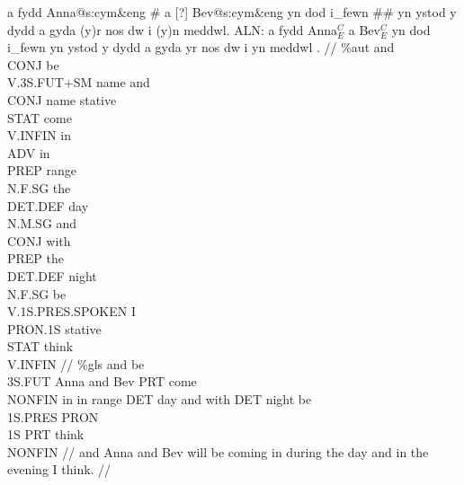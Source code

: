 \documentclass[12pt]{article}
\begin{document}
\def\suffdot#1{{\scriptsize .#1}}

\ex
\begingl
a fydd Anna@s:cym\&eng \# a [?] Bev@s:cym\&eng yn dod i\_fewn \#\# yn ystod y dydd a gyda (y)r nos dw i (y)n meddwl.
\gla ALN:  a fydd Anna$^{C}_{E}$ a Bev$^{C}_{E}$ yn dod i\_fewn yn ystod y dydd a gyda yr nos dw i yn meddwl .  //
\glb \%aut  and\\{CONJ} be\\{V.3S.FUT+SM} name and\\{CONJ} name stative\\{STAT} come\\{V.INFIN} in\\{ADV} in\\{PREP} range\\{N.F.SG} the\\{DET.DEF} day\\{N.M.SG} and\\{CONJ} with\\{PREP} the\\{DET.DEF} night\\{N.F.SG} be\\{V.1S.PRES.SPOKEN} I\\{PRON.1S} stative\\{STAT} think\\{V.INFIN}   //
\glb \%gls  and be\\{3S.FUT} Anna and Bev PRT come\\{NONFIN} in in range DET day and with DET night be\\{1S.PRES} PRON\\{1S} PRT think\\{NONFIN}   //
\glft and Anna and Bev will be coming in during the day and in the evening I think. //
\endgl
\xe
\end{document}
